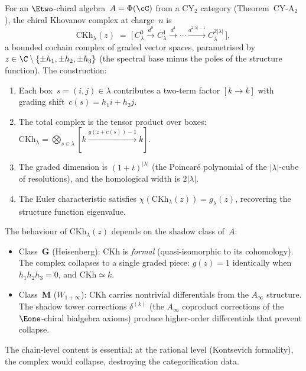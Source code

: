 \begin{construction}
\label{constr:chiral-khovanov}
For an $\Etwo$-chiral algebra~$A = \Phi(\cC)$ from a CY$_2$ category (Theorem~CY-A$_2$), the chiral Khovanov complex at charge~$n$ is
\[
 \mathrm{CKh}_\lambda(z)
 \;=\;
 \bigl[\, C^0_\lambda \xrightarrow{d^0} C^1_\lambda \xrightarrow{d^1} \cdots \xrightarrow{d^{2|\lambda|-1}} C^{2|\lambda|}_\lambda \,\bigr],
\]
a bounded cochain complex of graded vector spaces, parametrised by $z \in \C \setminus \{\pm h_1, \pm h_2, \pm h_3\}$ (the spectral base minus the poles of the structure function). The construction:
\begin{enumerate}[label=\textup{(\roman*)}]
 \item Each box~$s = (i,j) \in \lambda$ contributes a two-term factor $[k \to k]$ with grading shift~$c(s) = h_1 i + h_2 j$.
 \item The total complex is the tensor product over boxes: $\mathrm{CKh}_\lambda = \bigotimes_{s \in \lambda} [k \xrightarrow{g(z + c(s)) - 1} k]$.
 \item The graded dimension is $(1 + t)^{|\lambda|}$ (the Poincar\'e polynomial of the $|\lambda|$-cube of resolutions), and the homological width is $2|\lambda|$.
 \item The Euler characteristic satisfies $\chi(\mathrm{CKh}_\lambda(z)) = g_\lambda(z)$, recovering the structure function eigenvalue.
\end{enumerate}
\end{construction}

\begin{remark}
\label{rem:ckh-shadow-class}
The behaviour of $\mathrm{CKh}_\lambda(z)$ depends on the shadow class of~$A$:
\begin{itemize}
 \item Class~$\mathbf{G}$ (Heisenberg): $\mathrm{CKh}$ is \emph{formal} (quasi-isomorphic to its cohomology). The complex collapses to a single graded piece: $g(z) = 1$ identically when $h_1 h_2 h_3 = 0$, and $\mathrm{CKh} \simeq k$.
 \item Class~$\mathbf{M}$ ($W_{1+\infty}$): $\mathrm{CKh}$ carries nontrivial differentials from the $A_\infty$ structure. The shadow tower corrections $\delta^{(k)}$ (the $A_\infty$ coproduct corrections of the $\Eone$-chiral bialgebra axioms) produce higher-order differentials that prevent collapse.
\end{itemize}
The chain-level content is essential: at the rational level (Kontsevich formality), the complex would collapse, destroying the categorification data.
\end{remark}

